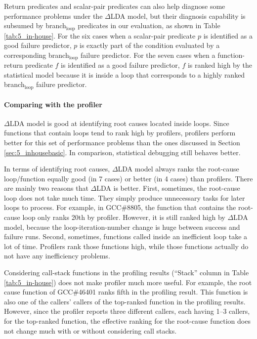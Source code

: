 Return predicates and scalar-pair predicates can also help diagnose some
performance problems under the $\Delta$LDA model, but their diagnosis
capability is subsumed by branch$_{\text{loop}}$ predicates in our evaluation,
as shown in Table \ref{tab:5_in-house}.
For the six cases when a scalar-pair predicate $p$ is identified as a good 
failure 
predictor, $p$ is exactly part of the condition evaluated by a corresponding
branch$_{\text{loop}}$ failure predictor.
For the seven cases when a function-return predicate
$f$ is identified as a good failure predictor, $f$ is ranked high by the
statistical model because it is inside a loop that corresponds to a highly
ranked branch$_{\text{loop}}$ failure predictor.


\paragraph{Comparing with the profiler} 
$\Delta$LDA model is good at identifying root causes located inside loops. 
Since functions that contain loops tend to rank high by profilers, profilers
perform better for this set of performance problems than the ones discussed
in Section \ref{sec:5_inhousebasic}. In comparison, statistical debugging still
behaves better.

In terms of identifying root causes, $\Delta$LDA model always ranks the
root-cause loop/function equally good (in 7 cases) 
or better (in 4 cases) than profilers. There are mainly two reasons that 
$\Delta$LDA is better. First, sometimes, the root-cause loop does not take
much time. They simply produce unnecessary tasks for later loops to process.
For example, in GCC\#8805, the function that contains the root-cause loop
only ranks 20th by profiler. However, it is still ranked high by $\Delta$LDA
model, because the loop-iteration-number change is huge between
success and failure runs. Second, sometimes, functions
called inside an inefficient loop take a lot of time. 
Profilers rank those functions high, while those functions actually do not
have any inefficiency problems.

Considering call-stack functions in the profiling results (``Stack'' column
in Table \ref{tab:5_in-house}) does not make profiler much more useful.
For example, the root cause function of GCC\#46401 ranks fifth in
the profiling result. This function is also one of the callers' callers of the
top-ranked function in the profiling results. However, since the profiler
reports three different callers, each having 1--3 callers,
for the top-ranked function, the effective ranking
for the root-cause function does not change much with or without considering
call stacks.
